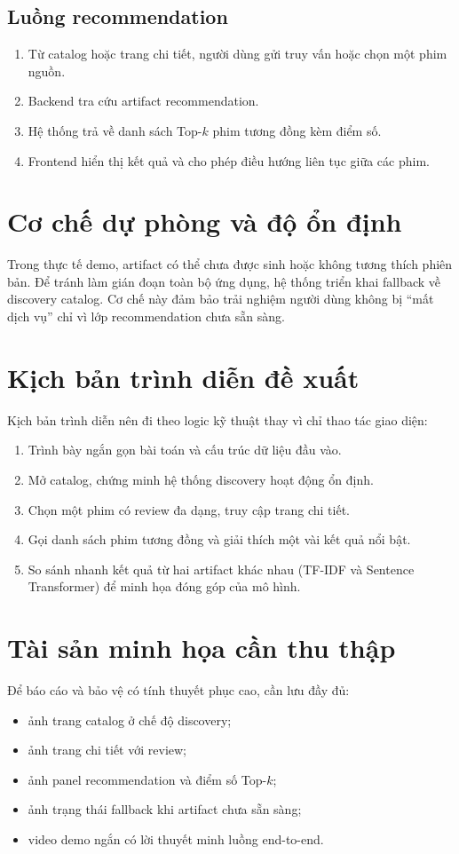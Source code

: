 \subsection{Luồng recommendation}
\begin{enumerate}[label=\arabic*.]
    \item Từ catalog hoặc trang chi tiết, người dùng gửi truy vấn hoặc chọn một phim nguồn.
    \item Backend tra cứu artifact recommendation.
    \item Hệ thống trả về danh sách Top-$k$ phim tương đồng kèm điểm số.
    \item Frontend hiển thị kết quả và cho phép điều hướng liên tục giữa các phim.
\end{enumerate}

\section{Cơ chế dự phòng và độ ổn định}
Trong thực tế demo, artifact có thể chưa được sinh hoặc không tương thích phiên bản. Để tránh làm gián đoạn toàn bộ ứng dụng, hệ thống triển khai fallback về discovery catalog. Cơ chế này đảm bảo trải nghiệm người dùng không bị ``mất dịch vụ'' chỉ vì lớp recommendation chưa sẵn sàng.

\section{Kịch bản trình diễn đề xuất}
Kịch bản trình diễn nên đi theo logic kỹ thuật thay vì chỉ thao tác giao diện:
\begin{enumerate}[label=\arabic*.]
    \item Trình bày ngắn gọn bài toán và cấu trúc dữ liệu đầu vào.
    \item Mở catalog, chứng minh hệ thống discovery hoạt động ổn định.
    \item Chọn một phim có review đa dạng, truy cập trang chi tiết.
    \item Gọi danh sách phim tương đồng và giải thích một vài kết quả nổi bật.
    \item So sánh nhanh kết quả từ hai artifact khác nhau (TF-IDF và Sentence Transformer) để minh họa đóng góp của mô hình.
\end{enumerate}

\section{Tài sản minh họa cần thu thập}
Để báo cáo và bảo vệ có tính thuyết phục cao, cần lưu đầy đủ:
\begin{itemize}
    \item ảnh trang catalog ở chế độ discovery;
    \item ảnh trang chi tiết với review;
    \item ảnh panel recommendation và điểm số Top-$k$;
    \item ảnh trạng thái fallback khi artifact chưa sẵn sàng;
    \item video demo ngắn có lời thuyết minh luồng end-to-end.
\end{itemize}


